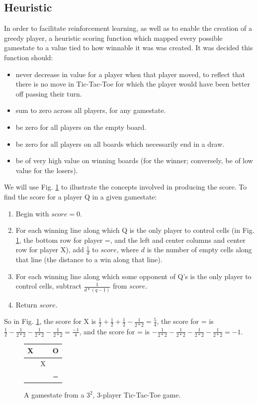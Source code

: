\documentclass[12pt,a4paper]{article}
\begin{document}
\subsection{Heuristic}
In order to facilitate reinforcement learning, as well as to enable the creation of a greedy player, a heuristic scoring function which mapped every possible gamestate to a value tied to how winnable it was was created. It was decided this function should:
\begin{itemize}\itemsep0pt
\item never decrease in value for a player when that player moved, to reflect that there is no move in Tic-Tac-Toe for which the player would have been better off passing their turn.
\item sum to zero across all players, for any gamestate.
\item be zero for all players on the empty board.
\item be zero for all players on all boards which necessarily end in a draw.
\item be of very high value on winning boards (for the winner; conversely, be of low value for the losers).
\end{itemize}
We will use Fig. \ref{fig:gamestate} to illustrate the concepts involved in producing the score. 
To find the score for a player Q in a given gamestate:
\begin{enumerate}\itemsep0pt
\item Begin with $score=0$. 
\item For each winning line along which Q is the only player to control cells (in Fig. \ref{fig:gamestate}, the bottom row for player =, and the left and center columns and center row for player X), add $\frac{1}{d}$ to $score$, where $d$ is the number of empty cells along that line (the distance to a win along that line).
\item For each winning line along which some opponent of Q's is the only player to control cells, subtract $\frac{1}{d*(q-1)}$ from $score$.
\item Return $score$.
\end{enumerate}
So in Fig. \ref{fig:gamestate}, the score for X is $\frac{1}{2} + \frac{1}{2} + \frac{1}{2} - \frac{1}{2*2} = \frac{5}{4}$, the score for = is $\frac{1}{2} - \frac{1}{2*2} -\frac{1}{2*2} - \frac{1}{2*2} = \frac{-1}{4}$, and the score for = is $-\frac{1}{2*2} - \frac{1}{2*2} - \frac{1}{2*2} - \frac{1}{2*2} = -1$.
\begin{figure}[htb]
\centering
\begin{tabular}{c|c|c} %
    X & \hspace{0.1cm} & O  \\ \hline
    \hspace{0.1cm} & X & \hspace{0.1cm} \\ \hline
    \hspace{0.1cm} & \hspace{0.1cm} & = \\ 
    \end{tabular}
\caption{A gamestate from a $3^2$, $3$-player Tic-Tac-Toe game.} \label{fig:gamestate}
\end{figure}
\end{document}
